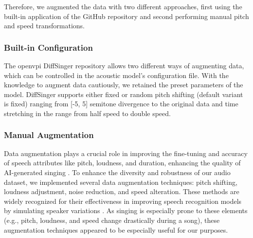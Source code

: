 \documentclass[a4paper]{article}
\begin{document}
	Therefore, we augmented the data with two different approaches, first using the built-in application of the GitHub repository and second performing manual pitch and speed transformations.
	
	\subsubsection{Built-in Configuration}
	
	The openvpi DiffSinger repository allows two different ways of augmenting data, which can be controlled in the acoustic model’s configuration file. With the knowledge to augment data cautiously, we retained the preset parameters of the model. DiffSinger supports either fixed or random pitch shifting (default variant is fixed) ranging from [-5, 5] semitone divergence to the original data and time stretching in the range from half speed to double speed. \cite{openvpi-diffsinger}
	
	\subsubsection{Manual Augmentation}
	
	Data augmentation plays a crucial role in improving the fine-tuning and accuracy of speech attributes like pitch, loudness, and duration, enhancing the quality of AI-generated singing \cite{Morrison2024}.
	To enhance the diversity and robustness of our audio dataset, we implemented several data augmentation techniques: pitch shifting, loudness adjustment, noise reduction, and speed alteration. These methods are widely recognized for their effectiveness in improving speech recognition models by simulating speaker variations \cite{Morrison2024}. As singing is especially prone to these elements (e.g., pitch, loudness, and speed change drastically during a song), these augmentation techniques appeared to be especially useful for our purposes.
	
\end{document}
